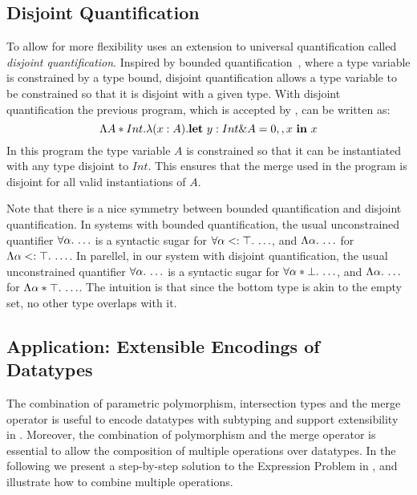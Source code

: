 \subsection{Disjoint Quantification}
To allow for more flexibility \name uses an extension to universal
quantification called \emph{disjoint quantification}.  Inspired by
bounded quantification~\cite{}, where a type variable is constrained by a type
bound, disjoint quantification allows a type variable to be
constrained so that it is disjoint with a
given type. With disjoint quantification the previous program, which
is accepted by \name, can be written as:
\[\Lambda A * Int.\lambda (x:A). {\bf let}~y : Int \& A = 0 ,, x~{\bf in}~x\]
In this program the type variable $A$ is constrained so that it can be
instantiated with any type disjoint to $Int$. This ensures that the
merge used in the program is disjoint for all valid instantiations of $A$.

Note that there is a nice symmetry between bounded quantification and disjoint quantification.
In systems with bounded quantification,
the usual unconstrained quantifier $\forall \alpha.\, \ldots$
is a syntactic sugar for $\forall \alpha <: \top.\, \ldots$, and
$\Lambda \alpha.\, \ldots$ for $\Lambda \alpha <: \top.\, \ldots$.
In parellel, in our system with disjoint quantification,
the usual unconstrained quantifier $\forall \alpha.\, \ldots$
is a syntactic sugar for $\forall \alpha * \bot.\, \ldots$, and
$\Lambda \alpha.\, \ldots$ for $\Lambda \alpha * \top.\, \ldots$.
The intuition is that since the bottom type is akin to the empty set,
no other type overlaps with it.

\begin{comment}
With this tool in hand, we can rewrite the program above to:
\[
\blam {\alpha \disjoint \tyint} {\lam x {\alpha \inter \tyint} x}
\]

This program typechecks because while $x$ is of type $\alpha \inter \tyint$,
and $\alpha$ is disjoint with $\tyint$. Similarly, in the new system,
the original program no longer typechecks, thus preventing overlapping types.
\end{comment}

\subsection{Application: Extensible Encodings of Datatypes}
\label{subsec:OAs}

The combination of parametric polymorphism, intersection types and the
merge operator is useful to encode datatypes with subtyping and
support extensibility in \name. Moreover, the combination of
polymorphism and the merge operator is essential to allow the
composition of multiple operations over datatypes. In the following 
we present a step-by-step solution to the Expression Problem in \name, 
and illustrate how to combine multiple operations.

